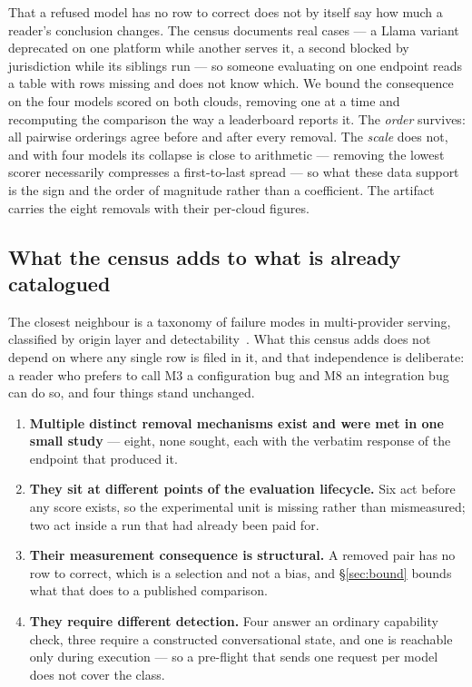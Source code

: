 That a refused model has no row to correct does not by itself say how much a reader's conclusion changes.
The census documents real cases --- a Llama variant deprecated on one platform while another serves it, a
second blocked by jurisdiction while its siblings run --- so someone evaluating on one endpoint reads a
table with rows missing and does not know which. We bound the consequence on the four models scored on both
clouds, removing one at a time and recomputing the comparison the way a leaderboard reports it. The
\emph{order} survives: all pairwise orderings agree before and after every removal. The \emph{scale} does
not, and with four models its collapse is close to arithmetic --- removing the lowest scorer necessarily
compresses a first-to-last spread --- so what these data support is the sign and the order of magnitude
rather than a coefficient. The artifact carries the eight removals with their per-cloud figures.

\subsection{What the census adds to what is already catalogued}
\label{sec:tassonomia}

The closest neighbour is a taxonomy of failure modes in multi-provider serving, classified by origin layer
and detectability~\citep{failureatlas}. What this census adds does not depend on where any single row is
filed in it, and that independence is deliberate: a reader who prefers to call M3 a configuration bug and
M8 an integration bug can do so, and four things stand unchanged.

\begin{enumerate}
\item \textbf{Multiple distinct removal mechanisms exist and were met in one small study} --- eight, none
  sought, each with the verbatim response of the endpoint that produced it.
\item \textbf{They sit at different points of the evaluation lifecycle.} Six act before any score exists,
  so the experimental unit is missing rather than mismeasured; two act inside a run that had already been
  paid for.
\item \textbf{Their measurement consequence is structural.} A removed pair has no row to correct, which is
  a selection and not a bias, and \S\ref{sec:bound} bounds what that does to a published comparison.
\item \textbf{They require different detection.} Four answer an ordinary capability check, three require a
  constructed conversational state, and one is reachable only during execution --- so a pre-flight that
  sends one request per model does not cover the class.
\end{enumerate}

